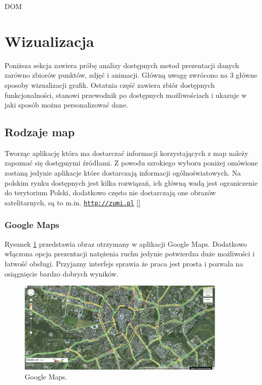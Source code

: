 DOM

\section{Wizualizacja}
\label{sec:wizualizacja}

Poniższa sekcja zawiera próbę analizy dostępnych metod prezentacji danych zarówno zbiorów punktów, zdjęć i animacji. Główną uwagę zwrócono na 3 główne sposoby wizualizacji grafik. Ostatnia część zawiera zbiór dostępnych funkcjonalności, stanowi przewodnik po dostępnych możliwościach i ukazuje w jaki sposób można personalizować dane.


\subsection{Rodzaje map}
\label{subsec:Rodzaje map}

Tworząc aplikację która ma dostarczać informacji korzystających z map należy zapoznać się dostępnymi źródłami. Z powodu szrokiego wyboru poniżej omówione zostaną jedynie aplikacje które dostarczają informacji ogólnoświatowych. Na polskim rynku dostępnych jest kilka rozwiązań, ich główną wadą jest ograniczenie do terytorium Polski, dodatkowo często nie dostarczają one obrazów satelitarnych, są to m.in. \underline{\texttt{http://zumi.pl}}
\ref{}

\subsubsection{Google Maps}
\label{subsubsec:Google Maps}
\nocite{googlemapsbegin}
Rysunek \ref{fig:googleMaps_1} przedstawia obraz otrzymany w aplikacji Google Maps. Dodatkowo włączona opcja prezentacji natężenia ruchu jedynie potwierdza duże możliwości i łatwość obsługi. Przyjazny interfejs sprawia że praca jest prosta i pozwala na osiągnięcie bardzo dobrych wyników.


\begin{figure}[H]
  \centering
    \includegraphics[width=100mm]{ge/gm_1.jpg}
  \caption{Google Maps.}
  \label{fig:googleMaps_1}
\end{figure}


